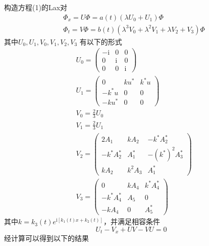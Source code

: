 构造方程(1)的Lax对
\begin{align}
  & \Phi_{x} = U\Phi = a(t)(\lambda U_{0} + U_{1})\Phi \\
  & \Phi_{t} = V\Phi = b(t)(\lambda^{3}V_{0} + \lambda^{2}V_{1} + \lambda V_{2} + V_{3})\Phi
\end{align}
其中$U_{0}, U_{1}, V_{0}, V_{1}, V_{2}, V_{3}$ 有以下的形式
\begin{align}
  & U_{0} = \begin{pmatrix}
             -\mathrm{i} & 0 & 0 \\
              0 & \mathrm{i} & 0 \\
              0 & 0 & \mathrm{i}
            \end{pmatrix} \\
  & U_{1} = \begin{pmatrix}
              0 & ku^{*} & k^{*}u \\
              -k^{*}u & 0 & 0 \\
              -ku^{*} & 0 & 0
            \end{pmatrix} \\
  & V_{0} = \frac{2}{3}U_{0} \\
  & V_{1} = \frac{2}{3}U_{1} \\
  & V_{2} = \begin{pmatrix}
              2A_{1} & kA_{2} & -k^{*}A_{2}^{*} \\
              -k^{*}A_{2}^{*} & A_{1}^{*} & -(k^{*})^{2}A_{3}^{*} \\
              kA_{2} & k^{2}A_{3} & A_{1}^{*}
            \end{pmatrix} \\
  & V_{3} = \begin{pmatrix}
              0 & kA_{4} & k^{*}A_{4}^{*} \\
              -k^{*}A_{4}^{*} & A_{5} & 0 \\
              -kA_{4} & 0 & A_{5}^{*}
            \end{pmatrix}
\end{align}
其中$k=k_{3}(t)e^{\mathrm{i}[k_{1}(t)x + k_{2}(t)]}$，并满足相容条件
\begin{equation}
  U_{t} - V_{x} + UV - VU = 0
\end{equation}
经计算可以得到以下的结果

